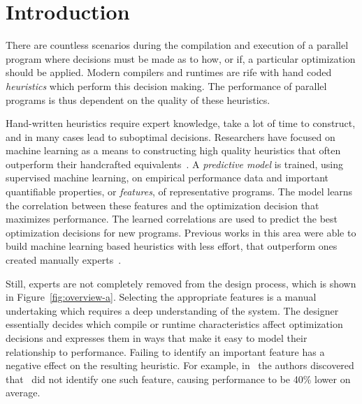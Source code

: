 \section{Introduction}

There are countless scenarios during the compilation and execution of a parallel program where decisions must be made as to how, or if, a particular optimization should be applied. Modern compilers and runtimes are rife with hand coded \emph{heuristics} which perform this decision making. The performance of parallel programs is thus dependent on the quality of these heuristics.

Hand-written heuristics require expert knowledge, take a lot of time to construct, and in many cases lead to suboptimal decisions. Researchers have focused on machine learning as a means to constructing high quality heuristics that often outperform their handcrafted equivalents~\cite{Micolet2016,Falch2015,Stephenson2005,Agakov,Cummins2015a}. A \emph{predictive model} is trained, using supervised machine learning, on empirical performance data and important quantifiable properties, or \emph{features}, of representative programs. The model learns the correlation between these features and the optimization decision that maximizes performance. The learned correlations are used to predict the best optimization decisions for new programs. Previous works in this area were able to build machine learning based heuristics with less effort, that outperform ones created manually experts~\cite{Grewe2013,Magni2014}.

Still, experts are not completely removed from the design process, which is shown in Figure~\ref{fig:overview-a}. Selecting the appropriate features is a manual undertaking which requires a deep understanding of the system. The designer essentially decides which compile or runtime characteristics affect optimization decisions and expresses them in ways that make it easy to model their relationship to performance. Failing to identify an important feature has a negative effect on the resulting heuristic. For example, in~\cite{Cummins2017a} the authors discovered that~\cite{Grewe2013} did not identify one such feature, causing performance to be 40\% lower on average.

